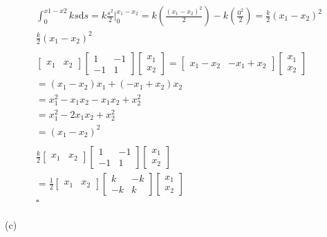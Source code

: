 \documentclass{article}
\begin{document}
	\begin{align*}
		\int_{0}^{x1-x2}{ks\mathrm{d}s} = k\frac{s^2}{2}\Big|_{0}^{x_1-x_2} =
		k(\frac{(x_1-x_2)^2}{2}) - k(\frac{0^2}{2}) = \frac{k}{2}(x_1-x_2)^2
		\\
		\frac{k}{2}(x_1-x_2)^2\\
		\\
		\begin{bmatrix}x_1&x_2\end{bmatrix}
		\begin{bmatrix}1&-1\\-1&1\end{bmatrix}
		\begin{bmatrix}x_1\\x_2\end{bmatrix} =		
		\begin{bmatrix}x_1-x_2&-x_1+x_2\end{bmatrix}		\begin{bmatrix}x_1\\x_2\end{bmatrix}\\
		= (x_1-x_2)x_1+(-x_1+x_2)x_2\\
		= x_1^2-x_1x_2-x_1x_2+x_2^2\\
		= x_1^2-2x_1x_2+x_2^2\\
		= (x_1-x_2)^2\\
		\\
		\frac{k}{2}\begin{bmatrix}x_1&x_2\end{bmatrix}		\begin{bmatrix}1&-1\\-1&1\end{bmatrix}\begin{bmatrix}x_1\\x_2\end{bmatrix}\\
		= \frac{1}{2} \begin{bmatrix}x_1&x_2\end{bmatrix}	
		\begin{bmatrix}k&-k\\-k&k\end{bmatrix}\begin{bmatrix}x_1\\x_2\end{bmatrix}\\
		\square
	\end{align*}
	\\
	(c)\\
	\\
\end{document}
